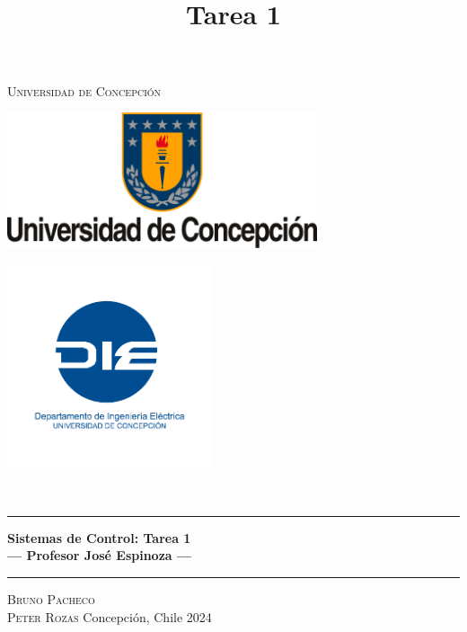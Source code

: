 \title{{\Large \\ Tarea 1 \\[0.1 cm]}}

\pagestyle{fancy}
\fancyhf{}
\lhead{\thetitle}
\cfoot{\thepage}

\begin{titlepage}
    \newcommand{\drop}{0.1\textheight}
    \newcommand{\halfdrop}{0.05\textheight}
    \vspace*{\drop}
    \begin{center}
    {\LARGE\textsc{Universidad de Concepción}}\\[\drop]
    \begin{minipage}{0.47\linewidth}
        \centering
        {\includegraphics[height=4cm]{extras/logo_udec.png}}
    \end{minipage}
    \begin{minipage}{0.47\linewidth}  %
        \centering
        {\includegraphics[height=6cm]{extras/logo_die.png}}
    \end{minipage}\\[\halfdrop]
    \rule{\textwidth}{1pt}\par
    \vspace{0.5\baselineskip}
    {\huge\bfseries Sistemas de Control: Tarea 1\\
    \large --- Profesor José Espinoza ---}\\[0.5\baselineskip]
    \rule{\textwidth}{1pt}\par
    \vfill
    {\Large\textsc{Bruno Pacheco \\ Peter Rozas}}
    \vfill
    Concepción, Chile
    \vfill
    {\large 2024}
    \end{center}
\end{titlepage}


\fancyfoot[C]{\thepage}  %
\renewcommand{\footrulewidth}{0.4pt}
